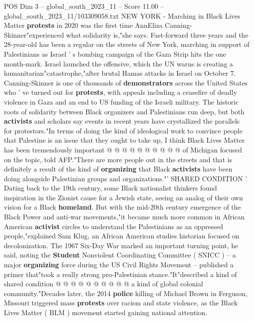 \begin{textsample}{POS Dim 3 – global\_south\_2023\_11 – Score 11.00 – global\_south\_2023\_11/103309058.txt}  \label{ex:f3_pos_370}
NEW YORK - Marching in Black Lives Matter \textbf{protests} in 2020 was the first time AnnEliza Canning-Skinner"experienced what solidarity is,"she says.
Fast-forward three years and the 28-year-old has been a regular on the streets of New York, marching in support of Palestinians as Israel ' s bombing campaign of the Gaza Strip hits the one month-mark.
Israel launched the offensive, which the UN warns is creating a humanitarian"catastrophe,"after brutal Hamas attacks in Israel on October 7.
Canning-Skinner is one of thousands of \textbf{demonstrators} across the United States who ' ve turned out for \textbf{protests}, with appeals including a ceasefire of deadly violence in Gaza and an end to US funding of the Israeli military.
The historic roots of solidarity between Black organizers and Palestinians run deep, but both \textbf{activists} and scholars say events in recent years have crystallized the parallels for protestors."In terms of doing the kind of ideological work to convince people that Palestine is an issue that they ought to take up, I think Black Lives Matter has been tremendously important @ @ @ @ @ @ @ @ @ @ of Michigan focused on the topic, told AFP."There are more people out in the streets and that is definitely a result of the kind of \textbf{organizing} that Black \textbf{activists} have been doing alongside Palestinian groups and organizations."' SHARED CONDITION ' Dating back to the 19th century, some Black nationalist thinkers found inspiration in the Zionist cause for a Jewish state, seeing an analog of their own vision for a Black \textbf{homeland}.
But with the mid-20th century emergence of the Black Power and anti-war movements,"it became much more common in African American \textbf{activist} circles to understand the Palestinians as an oppressed people,"explained Sam Klug, an African American studies historian focused on decolonization.
The 1967 Six-Day War marked an important turning point, he said, noting the \textbf{Student} Nonviolent Coordinating Committee ( SNICC ) -- a major \textbf{organizing} force during the US Civil Rights Movement -- published a primer that"took a really strong pro-Palestinian stance."It"described a kind of shared condition @ @ @ @ @ @ @ @ @ @ a kind of global colonial community."Decades later, the 2014 \textbf{police} killing of Michael Brown in Ferguson, Missouri triggered mass \textbf{protests} over racism and state violence, as the Black Lives Matter ( BLM ) movement started gaining national attention.

\end{textsample}
